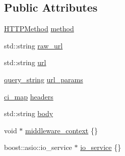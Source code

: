 \subsection*{Public Attributes}
\begin{DoxyCompactItemize}
\item 
\hyperlink{namespacecrow_a02d34072d2b3415aee5e7287edd06ae1}{H\-T\-T\-P\-Method} \hyperlink{structcrow_1_1request_a79ac893dd6ad4ec5752dea0cec65ce71}{method}
\item 
std\-::string \hyperlink{structcrow_1_1request_a72f5504a56f9ba70d7d33f86aaf9bc8a}{raw\-\_\-url}
\item 
std\-::string \hyperlink{structcrow_1_1request_aa3df34c56847d6d42887e73655276167}{url}
\item 
\hyperlink{classcrow_1_1query__string}{query\-\_\-string} \hyperlink{structcrow_1_1request_a745d5a94e9e9ae1fed64674aae0194b0}{url\-\_\-params}
\item 
\hyperlink{namespacecrow_a9090432313cd58380727a6c4384ee792}{ci\-\_\-map} \hyperlink{structcrow_1_1request_a86d6c2a93b50611c4a5b5643b6da6540}{headers}
\item 
std\-::string \hyperlink{structcrow_1_1request_afff683ed63a9e4067683786c3c6218c2}{body}
\item 
void $\ast$ \hyperlink{structcrow_1_1request_a9de0c8721b1c26aab317db0bcdcf1b8a}{middleware\-\_\-context} \{\}
\item 
boost\-::asio\-::io\-\_\-service $\ast$ \hyperlink{structcrow_1_1request_aeb396e1380312b44ebc9646cf73dbb00}{io\-\_\-service} \{\}
\end{DoxyCompactItemize}


